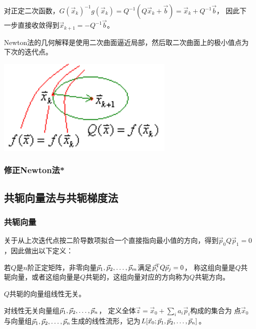对正定二次函数，$G(\vec{x}_k)^{-1} g(\vec{x}_k) = Q^{-1} (Q \vec{x}_k + \vec{b})=\vec{x}_k + Q^{-1}\vec{b}$，
因此下一步直接收敛得到$\vec{x}_{k+1} = -Q^{-1}\vec{b}$。

Newton法的几何解释是使用二次曲面逼近局部，然后取二次曲面上的极小值点为下次的迭代点。

\begin{center}
    \includegraphics[width=.6\linewidth]{fig/niudunfa.png}
\end{center}

\subsubsection{修正Newton法*}

\subsection{共轭向量法与共轭梯度法}
\subsubsection{共轭向量}
关于从上次迭代点按二阶导数项拟合一个直接指向最小值的方向，得到$\vec{p}_0 Q\vec{p}_1=0$，因此做出以下定义：
\begin{definition}
    若$Q$是$n$阶正定矩阵，非零向量$\VectorComma{\vec{p}}{m}$满足$\vec{p}_i^\mathrm{T} Q\vec{p}_j=0$，
    称这组向量是$Q$共轭向量，或者这组向量是$Q$共轭的，这组向量对应的方向称为$Q$共轭方向。
\end{definition}

\begin{theorem}
    $Q$共轭的向量组线性无关。
\end{theorem}

\begin{definition}
    对线性无关向量组$\VectorComma{\vec{p}}{n}$，
    定义全体$\vec{z}=\vec{x}_0+\sum_i a_i\vec{p}_i$构成的集合为
    点$\vec{x}_0$与向量组$\VectorComma{\vec{p}}{n}$生成的线性流形，记为$L[\vec{x}_0;\VectorComma{\vec{p}}{n}]$。
\end{definition}

